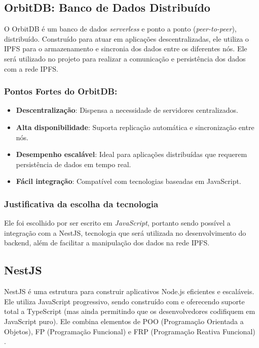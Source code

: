 \subsection{OrbitDB: Banco de Dados Distribuído}

O OrbitDB é um banco de dados \textit{serverless} e ponto a ponto (\textit{peer-to-peer}), distribuído. Construído para atuar em aplicações descentralizadas, ele utiliza o IPFS para o armazenamento e sincronia dos dados entre os diferentes nós. Ele será utilizado no projeto para realizar a comunicação e persistência dos dados com a rede IPFS.

\subsubsection*{Pontos Fortes do OrbitDB:}
\begin{itemize}
    \item \textbf{Descentralização}: Dispensa a necessidade de servidores centralizados.
    \item \textbf{Alta disponibilidade}: Suporta replicação automática e sincronização entre nós.
    \item \textbf{Desempenho escalável}: Ideal para aplicações distribuídas que requerem persistência de dados em tempo real.
    \item \textbf{Fácil integração}: Compatível com tecnologias baseadas em JavaScript.
\end{itemize}

\subsubsection{Justificativa da escolha da tecnologia}
Ele foi escolhido por ser escrito em \textit{JavaScript}, portanto sendo possível a integração com a NestJS, tecnologia que será utilizada no desenvolvimento do backend, além de facilitar a manipulação dos dados na rede IPFS.

\subsection{NestJS}

NestJS é uma estrutura para construir aplicativos Node.js eficientes e escaláveis. Ele utiliza JavaScript progressivo, sendo construído com e oferecendo suporte total a TypeScript (mas ainda permitindo que os desenvolvedores codifiquem em JavaScript puro). Ele combina elementos de POO (Programação Orientada a Objetos), FP (Programação Funcional) e FRP (Programação Reativa Funcional) \cite{nestjs2025}.

